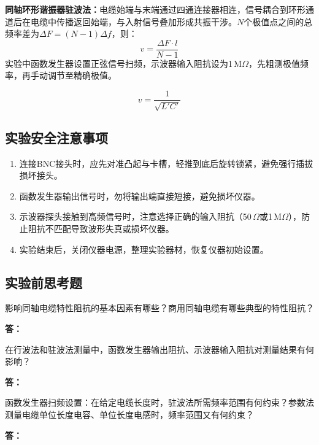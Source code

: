 \documentclass[dvipsnames, svgnames,a4paper,11pt]{article}
\newcommand{\answerblank}[1][3.8cm]{%
  \par\nopagebreak[4]\noindent\textbf{答：}\par\nopagebreak[4]\vspace*{#1}}
\begin{document}
\textbf{同轴环形谐振器驻波法：}电缆始端与末端通过四通连接器相连，信号耦合到环形通道后在电缆中传播返回始端，与入射信号叠加形成共振干涉。$N$个极值点之间的总频率差为$\Delta F=(N-1)\Delta f$，则：
\begin{equation}
	v = \frac{\Delta F \cdot l}{N-1}
\end{equation}
实验中函数发生器设置正弦信号扫频，示波器输入阻抗设为1\,M$\Omega$，先粗测极值频率，再手动调节至精确极值。


\begin{equation}
	v = \frac{1}{\sqrt{L'C'}}
\end{equation}

\subsection{实验安全注意事项}
\begin{enumerate}
	\item 连接BNC接头时，应先对准凸起与卡槽，轻推到底后旋转锁紧，避免强行插拔损坏接头。
	\item 函数发生器输出信号时，勿将输出端直接短接，避免损坏仪器。
	\item 示波器探头接触到高频信号时，注意选择正确的输入阻抗（50\,$\Omega$或1\,M$\Omega$），防止阻抗不匹配导致波形失真或损坏仪器。
	\item 实验结束后，关闭仪器电源，整理实验器材，恢复仪器初始设置。
\end{enumerate}

\subsection{实验前思考题}

\begin{question}
	影响同轴电缆特性阻抗的基本因素有哪些？商用同轴电缆有哪些典型的特性阻抗？
\end{question}
\answerblank[3.8cm]

\begin{question}
	在行波法和驻波法测量中，函数发生器输出阻抗、示波器输入阻抗对测量结果有何影响？
\end{question}
\answerblank[3.8cm]

\begin{question}
	函数发生器扫频设置：在给定电缆长度时，驻波法所需频率范围有何约束？参数法测量电缆单位长度电容、单位长度电感时，频率范围又有何约束？
\end{question}
\answerblank[3.8cm]
\end{document}
